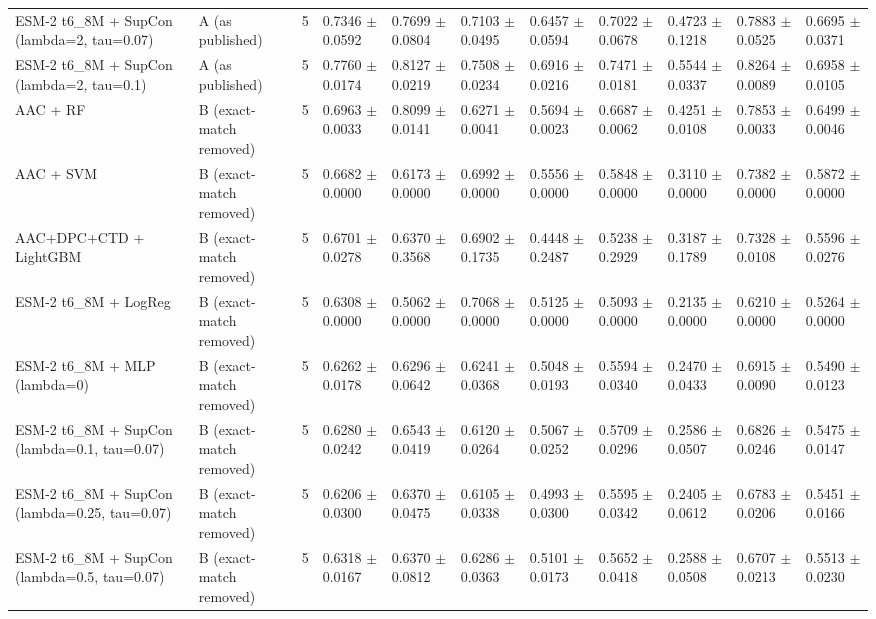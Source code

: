 \begin{table}[ht]
\begin{tabular}{lllllllllll}
ESM-2 t6\_8M + SupCon (lambda=2, tau=0.07) & A (as published) & 5 & 0.7346 $\pm$ 0.0592 & 0.7699 $\pm$ 0.0804 & 0.7103 $\pm$ 0.0495 & 0.6457 $\pm$ 0.0594 & 0.7022 $\pm$ 0.0678 & 0.4723 $\pm$ 0.1218 & 0.7883 $\pm$ 0.0525 & 0.6695 $\pm$ 0.0371 \\
ESM-2 t6\_8M + SupCon (lambda=2, tau=0.1) & A (as published) & 5 & 0.7760 $\pm$ 0.0174 & 0.8127 $\pm$ 0.0219 & 0.7508 $\pm$ 0.0234 & 0.6916 $\pm$ 0.0216 & 0.7471 $\pm$ 0.0181 & 0.5544 $\pm$ 0.0337 & 0.8264 $\pm$ 0.0089 & 0.6958 $\pm$ 0.0105 \\
AAC + RF & B (exact-match removed) & 5 & 0.6963 $\pm$ 0.0033 & 0.8099 $\pm$ 0.0141 & 0.6271 $\pm$ 0.0041 & 0.5694 $\pm$ 0.0023 & 0.6687 $\pm$ 0.0062 & 0.4251 $\pm$ 0.0108 & 0.7853 $\pm$ 0.0033 & 0.6499 $\pm$ 0.0046 \\
AAC + SVM & B (exact-match removed) & 5 & 0.6682 $\pm$ 0.0000 & 0.6173 $\pm$ 0.0000 & 0.6992 $\pm$ 0.0000 & 0.5556 $\pm$ 0.0000 & 0.5848 $\pm$ 0.0000 & 0.3110 $\pm$ 0.0000 & 0.7382 $\pm$ 0.0000 & 0.5872 $\pm$ 0.0000 \\
AAC+DPC+CTD + LightGBM & B (exact-match removed) & 5 & 0.6701 $\pm$ 0.0278 & 0.6370 $\pm$ 0.3568 & 0.6902 $\pm$ 0.1735 & 0.4448 $\pm$ 0.2487 & 0.5238 $\pm$ 0.2929 & 0.3187 $\pm$ 0.1789 & 0.7328 $\pm$ 0.0108 & 0.5596 $\pm$ 0.0276 \\
ESM-2 t6\_8M + LogReg & B (exact-match removed) & 5 & 0.6308 $\pm$ 0.0000 & 0.5062 $\pm$ 0.0000 & 0.7068 $\pm$ 0.0000 & 0.5125 $\pm$ 0.0000 & 0.5093 $\pm$ 0.0000 & 0.2135 $\pm$ 0.0000 & 0.6210 $\pm$ 0.0000 & 0.5264 $\pm$ 0.0000 \\
ESM-2 t6\_8M + MLP (lambda=0) & B (exact-match removed) & 5 & 0.6262 $\pm$ 0.0178 & 0.6296 $\pm$ 0.0642 & 0.6241 $\pm$ 0.0368 & 0.5048 $\pm$ 0.0193 & 0.5594 $\pm$ 0.0340 & 0.2470 $\pm$ 0.0433 & 0.6915 $\pm$ 0.0090 & 0.5490 $\pm$ 0.0123 \\
ESM-2 t6\_8M + SupCon (lambda=0.1, tau=0.07) & B (exact-match removed) & 5 & 0.6280 $\pm$ 0.0242 & 0.6543 $\pm$ 0.0419 & 0.6120 $\pm$ 0.0264 & 0.5067 $\pm$ 0.0252 & 0.5709 $\pm$ 0.0296 & 0.2586 $\pm$ 0.0507 & 0.6826 $\pm$ 0.0246 & 0.5475 $\pm$ 0.0147 \\
ESM-2 t6\_8M + SupCon (lambda=0.25, tau=0.07) & B (exact-match removed) & 5 & 0.6206 $\pm$ 0.0300 & 0.6370 $\pm$ 0.0475 & 0.6105 $\pm$ 0.0338 & 0.4993 $\pm$ 0.0300 & 0.5595 $\pm$ 0.0342 & 0.2405 $\pm$ 0.0612 & 0.6783 $\pm$ 0.0206 & 0.5451 $\pm$ 0.0166 \\
ESM-2 t6\_8M + SupCon (lambda=0.5, tau=0.07) & B (exact-match removed) & 5 & 0.6318 $\pm$ 0.0167 & 0.6370 $\pm$ 0.0812 & 0.6286 $\pm$ 0.0363 & 0.5101 $\pm$ 0.0173 & 0.5652 $\pm$ 0.0418 & 0.2588 $\pm$ 0.0508 & 0.6707 $\pm$ 0.0213 & 0.5513 $\pm$ 0.0230 \\

\end{tabular}
\end{table}
